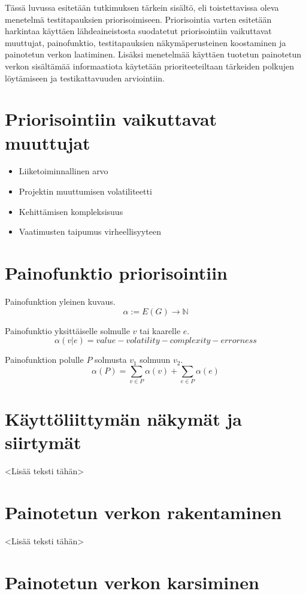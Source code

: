 Tässä luvussa esitetään tutkimuksen tärkein sisältö, eli toistettavissa oleva menetelmä testitapauksien priorisoimiseen.
Priorisointia varten esitetään harkintaa käyttäen lähdeaineistosta suodatetut priorisointiin vaikuttavat muuttujat, painofunktio, testitapauksien näkymäperusteinen koostaminen ja painotetun verkon laatiminen.
Lisäksi menetelmää käyttäen tuotetun painotetun verkon sisältämää informaatiota käytetään prioriteeteiltaan tärkeiden polkujen löytämiseen ja testikattavuuden arviointiin.

\section{Priorisointiin vaikuttavat muuttujat}

\begin{itemize}
  \item Liiketoiminnallinen arvo
  \item Projektin muuttumisen volatiliteetti
  \item Kehittämisen kompleksisuus
  \item Vaatimusten taipumus virheellisyyteen
\end{itemize}

\section{Painofunktio priorisointiin}

Painofunktion yleinen kuvaus.
\[\alpha := E(G) \rightarrow \mathbb{N}\]

Painofunktio yksittäiselle solmulle \(v\) tai kaarelle \(e\).
\[\alpha(v|e) = value - volatility - complexity - errorness\]

Painofunktion polulle \(P\) solmusta \(v_1\) solmuun \(v_2\).
\[\alpha(P) = \sum_{v \in P} \alpha(v) + \sum_{e \in P} \alpha(e)\]

\section{Käyttöliittymän näkymät ja siirtymät}

<Lisää teksti tähän>

\section{Painotetun verkon rakentaminen}

<Lisää teksti tähän>

\section{Painotetun verkon karsiminen}


